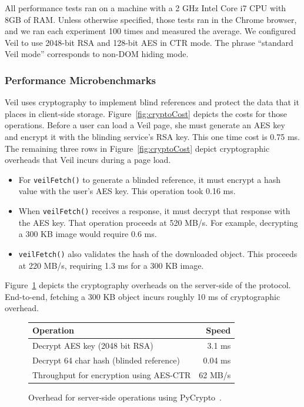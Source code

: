 All performance tests ran on a machine with
a 2 GHz Intel Core i7 CPU with 8GB of RAM.
Unless otherwise specified, those tests ran in
the Chrome browser, and we ran each experiment
100 times and measured the average. We configured
Veil to use 2048-bit RSA and 128-bit AES in CTR
mode. The phrase ``standard Veil mode''
corresponds to non-DOM hiding mode.

\subsubsection{Performance Microbenchmarks}
\label{sec:microbench}

Veil uses cryptography to implement blind references
and protect the data that it places in client-side storage.
Figure~\ref{fig:cryptoCost} depicts the costs %
for those operations. Before a user can load a Veil
page, she must generate an AES key and encrypt it
with the blinding service's RSA key. This one time
cost is 0.75 ms. The remaining three rows in Figure~\ref{fig:cryptoCost}
depict cryptographic %
overheads that Veil incurs during a page load.
\begin{itemize}
	\item For \texttt{veilFetch()} to generate a
	blinded reference, it must encrypt a
	hash value with the user's AES key. This
	operation took 0.16 ms.
	\item When \texttt{veilFetch()} receives a
	response, it must decrypt that response
	with the AES key. That operation proceeds
	at 520 MB/s. For example, decrypting a
	300 KB image would require 0.6 ms.
	\item \texttt{veilFetch()} also validates the
	hash of the downloaded object. This
	proceeds at 220 MB/s, requiring 1.3 ms
	for a 300 KB image.
\end{itemize}
Figure~\ref{fig:cryptoCostServer} depicts the
cryptography overheads on the server-side of
the protocol. End-to-end, fetching a 300 KB
object incurs roughly 10 ms of cryptographic
overhead. 

\begin{figure}
	\centering
	\begin{tabular}{lr}
		\toprule
		\bf Operation & \bf Speed \\
		\midrule
		Decrypt AES key (2048 bit RSA)  & \phantom{0}3.1 ms \\
		Decrypt 64 char hash (blinded reference) & 0.04 ms \\
		Throughput for encryption using AES-CTR & 62 MB/s \\
		\bottomrule
	\end{tabular}
	\caption{Overhead for server-side operations using PyCrypto~\cite{pyCrypto}.}
	\label{fig:cryptoCostServer}
\end{figure}

